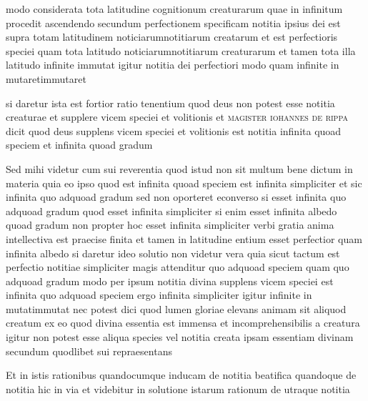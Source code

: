 \documentclass[twoside, openright]{report}
\newcommand{\name}[1]{\textsc{#1}}
\begin{document}
        \pstart
        modo considerata tota latitudine cognitionum creaturarum quae in infinitum procedit ascendendo secundum perfectionem specificam notitia ipsius dei est supra totam latitudinem noticiarumnotitiarum creatarum et est perfectioris speciei quam tota latitudo noticiarumnotitiarum creaturarum et tamen tota illa latitudo infinite immutat igitur notitia dei perfectiori modo quam infinite in mutaretimmutaret
        \pend
     
        \pstart
        si daretur ista est fortior ratio tenentium quod deus non potest esse notitia creaturae et supplere vicem speciei et volitionis  et \name{magister iohannes de rippa}\index[persons]{} dicit quod deus supplens vicem speciei et volitionis est notitia infinita quoad speciem et infinita quoad gradum
        \pend
     
        \pstart
        Sed mihi videtur cum sui reverentia quod istud non sit multum bene dictum in materia quia eo ipso quod est infinita quoad speciem est infinita simpliciter et sic infinita quo adquoad gradum sed non oporteret econverso si esset infinita quo adquoad gradum quod esset infinita simpliciter  si enim esset infinita albedo quoad gradum non propter hoc esset infinita simpliciter verbi gratia anima intellectiva est praecise finita et tamen in latitudine entium esset perfectior quam infinita albedo si daretur ideo solutio non videtur vera quia sicut tactum est perfectio notitiae simpliciter magis attenditur quo adquoad speciem quam quo adquoad gradum modo per ipsum notitia divina supplens vicem speciei est infinita quo adquoad speciem ergo infinita simpliciter  igitur infinite in mutatimmutat nec potest dici quod lumen gloriae elevans animam sit aliquod creatum ex eo quod divina essentia est immensa et incomprehensibilis a creatura igitur non potest esse aliqua species vel notitia creata ipsam essentiam divinam secundum quodlibet sui repraesentans
        \pend
     
        \pstart
        Et in istis rationibus quandocumque inducam de notitia beatifica quandoque de notitia hic in via et videbitur in solutione istarum rationum de utraque notitia 
        \pend
      
        \bigskip
\end{document}
